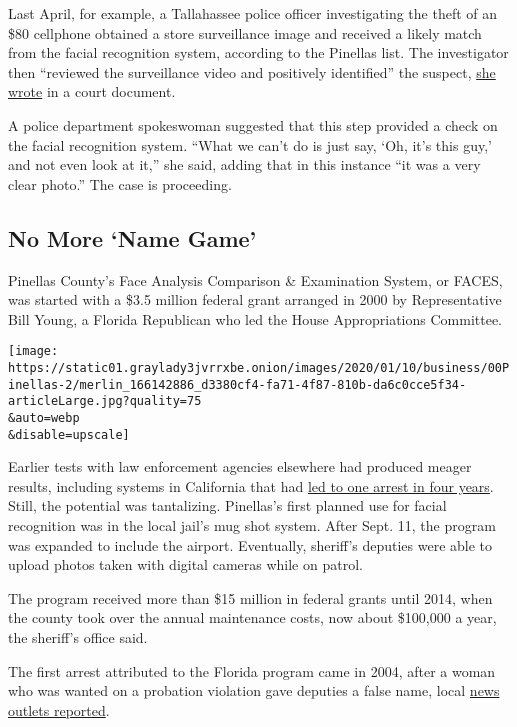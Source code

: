Last April, for example, a Tallahassee police officer investigating the
theft of an \$80 cellphone obtained a store surveillance image and
received a likely match from the facial recognition system, according to
the Pinellas list. The investigator then ``reviewed the surveillance
video and positively identified'' the suspect,
\href{https://www.documentcloud.org/documents/6586364-Targettheft-Redacted.html}{she
wrote} in a court document.

A police department spokeswoman suggested that this step provided a
check on the facial recognition system. ``What we can't do is just say,
`Oh, it's this guy,' and not even look at it,'' she said, adding that in
this instance ``it was a very clear photo.'' The case is proceeding.

\hypertarget{no-more-name-game}{%
\subsection{No More `Name Game'}\label{no-more-name-game}}

Pinellas County's Face Analysis Comparison \& Examination System, or
FACES, was started with a \$3.5 million federal grant arranged in 2000
by Representative Bill Young, a Florida Republican who led the House
Appropriations Committee.

\texttt{[image: https://static01.graylady3jvrrxbe.onion/images/2020/01/10/business/00Pinellas-2/merlin\_166142886\_d3380cf4-fa71-4f87-810b-da6c0cce5f34-articleLarge.jpg?quality=75\\\&auto=webp\\\&disable=upscale]}

Earlier tests with law enforcement agencies elsewhere had produced
meager results, including systems in California that had
\href{https://www.nytimes3xbfgragh.onion/2001/05/03/technology/those-dimples-may-be-digits.html}{led
to one arrest in four years}. Still, the potential was tantalizing.
Pinellas's first planned use for facial recognition was in the local
jail's mug shot system. After Sept. 11, the program was expanded to
include the airport. Eventually, sheriff's deputies were able to upload
photos taken with digital cameras while on patrol.

The program received more than \$15 million in federal grants until
2014, when the county took over the annual maintenance costs, now about
\$100,000 a year, the sheriff's office said.

The first arrest attributed to the Florida program came in 2004, after a
woman who was wanted on a probation violation gave deputies a false
name, local
\href{https://www.orlandosentinel.com/news/os-xpm-2004-09-15-0409150165-story.html}{news
outlets reported}.

